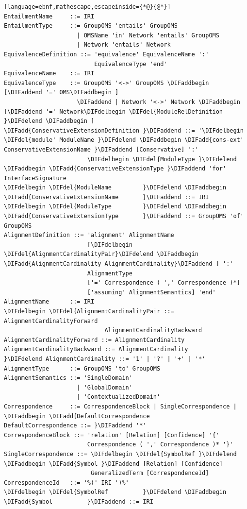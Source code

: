 \documentclass[10pt,fleqn,final]{scrreprt}
\newenvironment{definitions}[0]{\medskip }{}
\providecommand{\DIFadd}[1]{{\protect\color{blue}\uwave{#1}}} %
\providecommand{\DIFdel}[1]{{\protect\color{red}\sout{#1}}}                      %
\providecommand{\DIFaddbegin}{} %
\providecommand{\DIFaddend}{} %
\providecommand{\DIFdelbegin}{} %
\providecommand{\DIFdelend}{} %
\begin{document}
\begin{definitions}
\begin{lstlisting}[language=ebnf,mathescape,escapeinside={*@}{@*}]
EntailmentName     ::= IRI
EntailmentType     ::= GroupOMS 'entails' GroupOMS
                     | OMSName 'in' Network 'entails' GroupOMS
                     | Network 'entails' Network
EquivalenceDefinition ::= 'equivalence' EquivalenceName ':'
                          EquivalenceType 'end'
EquivalenceName    ::= IRI
EquivalenceType    ::= GroupOMS '<->' GroupOMS \DIFaddbegin [\DIFaddend '=' OMS\DIFaddbegin ]
                     \DIFaddend | Network '<->' Network \DIFaddbegin [\DIFaddend '=' Network\DIFdelbegin \DIFdel{ModuleRelDefinition }\DIFdelend \DIFaddbegin ]
\DIFadd{ConservativeExtensionDefinition }\DIFaddend ::= '\DIFdelbegin \DIFdel{module' ModuleName }\DIFdelend \DIFaddbegin \DIFadd{cons-ext' ConservativeExtensionName }\DIFaddend [Conservative] ':'
                        \DIFdelbegin \DIFdel{ModuleType }\DIFdelend \DIFaddbegin \DIFadd{ConservativeExtensionType }\DIFaddend 'for' InterfaceSignature
\DIFdelbegin \DIFdel{ModuleName         }\DIFdelend \DIFaddbegin \DIFadd{ConservativeExtensionName       }\DIFaddend ::= IRI
\DIFdelbegin \DIFdel{ModuleType         }\DIFdelend \DIFaddbegin \DIFadd{ConservativeExtensionType       }\DIFaddend ::= GroupOMS 'of' GroupOMS
AlignmentDefinition ::= 'alignment' AlignmentName
                        [\DIFdelbegin \DIFdel{AlignmentCardinalityPair}\DIFdelend \DIFaddbegin \DIFadd{AlignmentCardinality AlignmentCardinality}\DIFaddend ] ':'
                        AlignmentType
                        ['=' Correspondence ( ',' Correspondence )*]
                        ['assuming' AlignmentSemantics] 'end'
AlignmentName      ::= IRI
\DIFdelbegin \DIFdel{AlignmentCardinalityPair ::= AlignmentCardinalityForward
                             AlignmentCardinalityBackward
AlignmentCardinalityForward ::= AlignmentCardinality
AlignmentCardinalityBackward ::= AlignmentCardinality
}\DIFdelend AlignmentCardinality ::= '1' | '?' | '+' | '*'
AlignmentType      ::= GroupOMS 'to' GroupOMS
AlignmentSemantics ::= 'SingleDomain'
                     | 'GlobalDomain'
                     | 'ContextualizedDomain'
Correspondence     ::= CorrespondenceBlock | SingleCorrespondence | \DIFaddbegin \DIFadd{DefaultCorrespondence
DefaultCorrespondence ::= }\DIFaddend '*' 
CorrespondenceBlock ::= 'relation' [Relation] [Confidence] '{'
                        Correspondence ( ',' Correspondence )* '}'
SingleCorrespondence ::= \DIFdelbegin \DIFdel{SymbolRef }\DIFdelend \DIFaddbegin \DIFadd{Symbol }\DIFaddend [Relation] [Confidence]
                         GeneralizedTerm [CorrespondenceId]
CorrespondenceId   ::= '%(' IRI ')%'
\DIFdelbegin \DIFdel{SymbolRef          }\DIFdelend \DIFaddbegin \DIFadd{Symbol          }\DIFaddend ::= IRI

\end{lstlisting}
\end{definitions}
\end{document}
